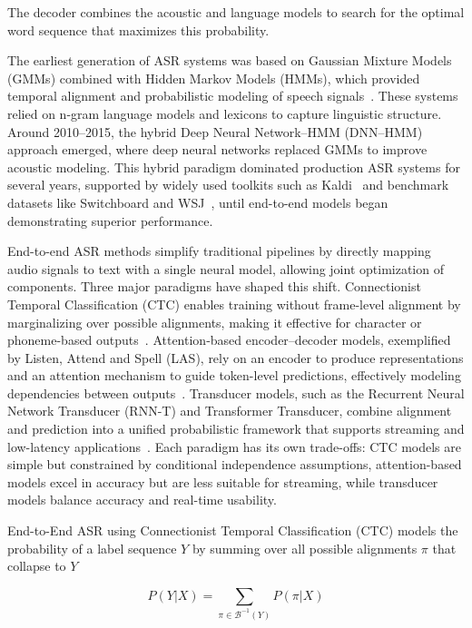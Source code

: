 The decoder combines the acoustic and language models to search for the optimal word sequence that maximizes this probability.


The earliest generation of ASR systems was based on Gaussian Mixture Models (GMMs) combined with Hidden Markov Models (HMMs), which provided temporal alignment and probabilistic modeling of speech signals~\cite{hinton2012dnn, rabiner1989hmm}. These systems relied on n-gram language models and lexicons to capture linguistic structure. Around 2010–2015, the hybrid Deep Neural Network–HMM (DNN–HMM) approach emerged, where deep neural networks replaced GMMs to improve acoustic modeling. This hybrid paradigm dominated production ASR systems for several years, supported by widely used toolkits such as Kaldi~\cite{povey2011kaldi} and benchmark datasets like Switchboard and WSJ~\cite{switchboard1992, wsj1993}, until end-to-end models began demonstrating superior performance.

End-to-end ASR methods simplify traditional pipelines by directly mapping audio signals to text with a single neural model, allowing joint optimization of components. Three major paradigms have shaped this shift. Connectionist Temporal Classification (CTC) enables training without frame-level alignment by marginalizing over possible alignments, making it effective for character or phoneme-based outputs~\cite{graves2006ctc}. Attention-based encoder–decoder models, exemplified by Listen, Attend and Spell (LAS), rely on an encoder to produce representations and an attention mechanism to guide token-level predictions, effectively modeling dependencies between outputs~\cite{chan2015las}. Transducer models, such as the Recurrent Neural Network Transducer (RNN-T) and Transformer Transducer, combine alignment and prediction into a unified probabilistic framework that supports streaming and low-latency applications~\cite{graves2012rnnt, he2019transformertransducer}. Each paradigm has its own trade-offs: CTC models are simple but constrained by conditional independence assumptions, attention-based models excel in accuracy but are less suitable for streaming, while transducer models balance accuracy and real-time usability.

End-to-End ASR using Connectionist Temporal Classification (CTC) models the probability of a label sequence $Y$ by summing over all possible alignments $\pi$ that collapse to $Y$

\begin{equation*}
    P(Y|X) = \sum_{\pi \in \mathcal{B}^{-1}(Y)} P(\pi|X)
\end{equation*}

